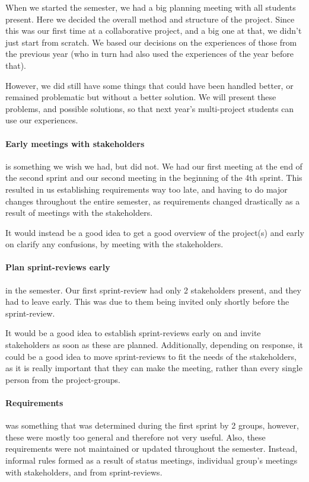 When we started the semester, we had a big planning meeting with all students present.
Here we decided the overall method and structure of the project.
Since this was our first time at a collaborative project, and a big one at that, we didn't just start from scratch.
We based our decisions on the experiences of those from the previous year (who in turn had also used the experiences of the year before that).

However, we did still have some things that could have been handled better, or remained problematic but without a better solution.
We will present these problems, and possible solutions, so that next year's multi-project students can use our experiences.

\paragraph{Early meetings with stakeholders} is something we wish we had, but did not.
We had our first meeting at the end of the second sprint and our second meeting in the beginning of the 4th sprint.
This resulted in us establishing requirements way too late, and having to do major changes throughout the entire semester, as requirements changed drastically as a result of meetings with the stakeholders.

It would instead be a good idea to get a good overview of the project(s) and early on clarify any confusions, by meeting with the stakeholders.

\paragraph{Plan sprint-reviews early} in the semester.
Our first sprint-review had only 2 stakeholders present, and they had to leave early.
This was due to them being invited only shortly before the sprint-review.

It would be a good idea to establish sprint-reviews early on and invite stakeholders as soon as these are planned.
Additionally, depending on response, it could be a good idea to move sprint-reviews to fit the needs of the stakeholders, as it is really important that they can make the meeting, rather than every single person from the project-groups.

\paragraph{Requirements} was something that was determined during the first sprint by 2 groups, however, these were mostly too general and therefore not very useful.
Also, these requirements were not maintained or updated throughout the semester.
Instead, informal rules formed as a result of status meetings, individual group's meetings with stakeholders, and from sprint-reviews.

